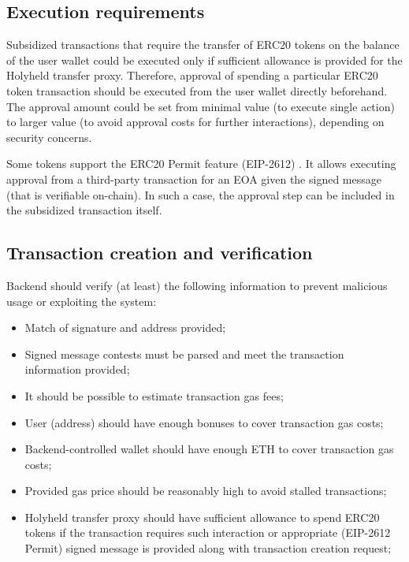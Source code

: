 \documentclass[12pt]{article}
\begin{document}
\subsection{Execution requirements}


Subsidized transactions that require the transfer of ERC20 tokens on the balance of the user wallet could be executed only if sufficient allowance is provided for the Holyheld transfer proxy. Therefore, approval of spending a particular ERC20 token transaction should be executed from the user wallet directly beforehand. The approval amount could be set from minimal value (to execute single action) to larger value (to avoid approval costs for further interactions), depending on security concerns.

Some tokens support the ERC20 Permit feature (EIP-2612) \cite{erc20permit}. It allows executing approval from a third-party transaction for an EOA given the signed message (that is verifiable on-chain). In such a case, the approval step can be included in the subsidized transaction itself.


\subsection{Transaction creation and verification}


Backend should verify (at least) the following information to prevent malicious usage or exploiting the system:
\begin{itemize}
\item Match of signature and address provided;
\item Signed message contests must be parsed and meet the transaction information provided;
\item It should be possible to estimate transaction gas fees;
\item User (address) should have enough bonuses to cover transaction gas costs;
\item Backend-controlled wallet should have enough ETH to cover transaction gas costs;
\item Provided gas price should be reasonably high to avoid stalled transactions;
\item Holyheld transfer proxy should have sufficient allowance to spend ERC20 tokens if the transaction requires such interaction or appropriate (EIP-2612 Permit) signed message is provided along with transaction creation request;
\end{itemize}
\end{document}
